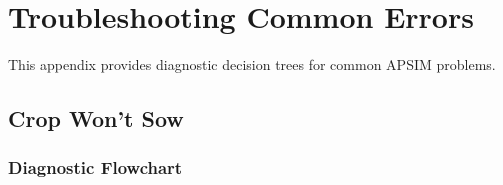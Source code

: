 
\chapter{Troubleshooting Common Errors}
\label{app:troubleshooting}

This appendix provides diagnostic decision trees for common APSIM problems.

\section{Crop Won't Sow}

\subsection{Diagnostic Flowchart}

